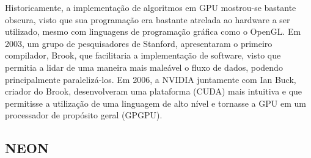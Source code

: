 Historicamente, a implementação de algoritmos em GPU mostrou-se bastante obscura, visto que sua programação era bastante atrelada ao hardware a ser utilizado, mesmo com linguagens de programação gráfica como o OpenGL. Em 2003, um grupo de pesquisadores de Stanford, apresentaram o primeiro compilador, Brook, que facilitaria a implementação de software, visto que permitia a lidar de uma maneira mais maleável o fluxo de dados, podendo principalmente paralelizá-los. Em 2006, a NVIDIA juntamente com Ian Buck, criador do Brook, desenvolveram uma plataforma (CUDA) mais intuitiva e que permitisse a utilização de uma linguagem de alto nível e tornasse a GPU em um processador de propósito geral (GPGPU)\cite{NVIDIA}.

\subsection{NEON}